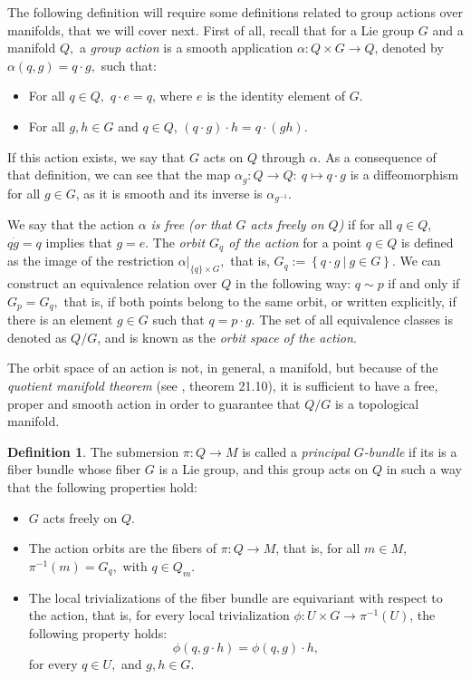 \documentclass[12pt, letterpaper, reqno]{amsart}
\theoremstyle{definition}
\newtheorem{df}{Definition}
\theoremstyle{plain}
\theoremstyle{remark}
\begin{document}
The following definition will require some definitions related to group actions over manifolds, that we will cover next. First of all, recall that for a Lie group $ G $ and a manifold $ Q, $ a \textit{group action} is a smooth application $ \alpha:  Q\times G \rightarrow Q $, denoted by $ \alpha(q,g) = q \cdot g, $ such that:

\begin{itemize}
	\item For all $ q\in Q, $ $ q\cdot e = q $, where $ e $ is the identity element of $ G. $   
	\item For all $ g,h\in G $ and $ q\in Q $, $ (q\cdot g) \cdot h =q\cdot(gh). $ 
\end{itemize}

If this action exists, we say that $ G $ acts on $ Q $ through $ \alpha. $ As a consequence of that definition, we can see that the map $ \alpha_g: Q \rightarrow Q: \ q\mapsto q\cdot g$ is a diffeomorphism for all $ g\in G $, as it is smooth and its inverse is $ \alpha_{g^{-1}}. $

We say that the action $ \alpha $ \textit{is free (or that $ G $ acts freely on $ Q $)} if for all $ q\in Q $, $ q\dot g =q$   implies that $ g=e. $ The \textit{orbit $ G_q $ of the action}  for a point $ q\in Q $  is defined as the image of the restriction $\alpha|_{\{q\}\times G},$  that is, $ G_q := \left\{q\cdot g \ | \ g\in G \right\}. $ We can construct an equivalence relation over $ Q $ in the following way: $ q\sim p $ if and only if $ G_p = G_q, $ that is, if both points belong to the same orbit, or written explicitly, if there is an element $ g\in G $ such that $ q = p\cdot g. $ The set of all equivalence classes is denoted as $ Q/G $, and is known as the \textit{orbit space of the action}.     

The orbit space of an action is not, in general, a manifold, but because of the \textit{quotient manifold theorem} (see \cite{lee2003introduction}, theorem 21.10), it is sufficient to have a free, proper and smooth action in order to guarantee that $ Q/G $ is a topological manifold.

\begin{df}
	The submersion $ \pi: Q \rightarrow M$  is called a \textit{principal $ G $-bundle} if its is a fiber bundle whose fiber $ G $ is a Lie group, and this group acts on $ Q $ in such a way that the following properties hold:
	\begin{itemize}
		\item $ G $ acts freely on $ Q $.
		\item The action orbits are the fibers of $ \pi:Q \rightarrow {M} $, that is, for all $ m\in M, $ $ \pi^{-1}(m) = G_q, $ with $ q\in Q_m. $ 
		\item The local trivializations of the fiber bundle are equivariant with respect to the action, that is, for every local trivialization $ \phi: U \times G \rightarrow \pi^{-1}(U) $, the following property holds: $$ \phi(q, g\cdot h) = \phi(q,g)\cdot h,$$  
			for every $ q\in U, $ and $ g,h\in G. $ 
	\end{itemize}
\end{df}
\end{document}
